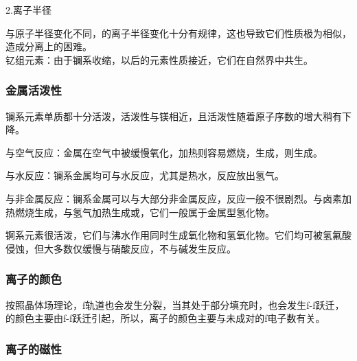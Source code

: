 \documentclass[a4paper,UTF8]{article}
\begin{document}
2.离子半径

与原子半径变化不同，的离子半径变化十分有规律，这也导致它们性质极为相似，造成分离上的困难。\\

钇组元素：由于镧系收缩，以后的元素性质接近，它们在自然界中共生。\\

\subsubsection{金属活泼性}

镧系元素单质都十分活泼，活泼性与镁相近，且活泼性随着原子序数的增大稍有下降。

与空气反应：金属在空气中被缓慢氧化，加热则容易燃烧，生成，则生成。

与水反应：镧系金属均可与水反应，尤其是热水，反应放出氢气。

与非金属反应：镧系金属可以与大部分非金属反应，反应一般不很剧烈。与卤素加热燃烧生成，与氢气加热生成或，它们一般属于金属型氢化物。

锕系元素很活泼，它们与沸水作用同时生成氧化物和氢氧化物。它们均可被氢氟酸侵蚀，但大多数仅缓慢与硝酸反应，不与碱发生反应。

\subsubsection{离子的颜色}

按照晶体场理论，f轨道也会发生分裂，当其处于部分填充时，也会发生f-f跃迁，的颜色主要由f-f跃迁引起，所以，离子的颜色主要与未成对的f电子数有关。

\subsubsection{离子的磁性}
\end{document}
